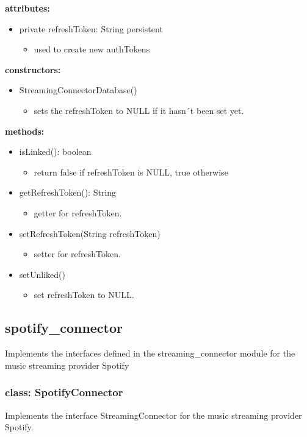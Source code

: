 \documentclass[oneside, ngerman]{sdqtechreport}
\begin{document}
\textbf{attributes:}
\begin{itemize}
    \item private refreshToken: String {persistent}
    \begin{itemize}
        \item used to create new authTokens
    \end{itemize}
\end{itemize}
\textbf{constructors:}
\begin{itemize}
    \item StreamingConnectorDatabase()
    \begin{itemize}
        \item sets the refreshToken to NULL if it hasn´t been set yet.
    \end{itemize}
\end{itemize}
\textbf{methods:}
\begin{itemize}
    \item isLinked(): boolean
    \begin{itemize}
        \item return false if refreshToken is NULL, true otherwise
    \end{itemize}
    \item getRefreshToken(): String
    \begin{itemize}
        \item getter for refreshToken.
    \end{itemize}
    \item setRefreshToken(String refreshToken)
    \begin{itemize}
        \item setter for refreshToken.
    \end{itemize}
    \item setUnliked()
    \begin{itemize}
        \item set refreshToken to NULL.
    \end{itemize}
\end{itemize}

\subsection{spotify\_connector}

Implements the interfaces defined in the streaming\_connector module for the music streaming provider Spotify

\subsubsection{class: SpotifyConnector}
Implements the interface StreamingConnector for the music streaming provider Spotify.
\end{document}
